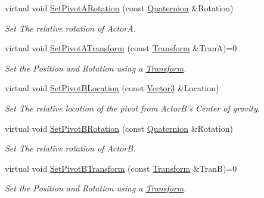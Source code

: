 \begin{DoxyCompactItemize}
virtual void \hyperlink{classphys_1_1DualTransformConstraint_ab602e9a72e490dcb34bb6ad2042a2341}{SetPivotARotation} (const \hyperlink{classphys_1_1Quaternion}{Quaternion} \&Rotation)
\begin{DoxyCompactList}\small\item\em Set The relative rotation of ActorA. \item\end{DoxyCompactList}\item 
virtual void \hyperlink{classphys_1_1DualTransformConstraint_af2ff2bca0d94f113ef47a8dfddeadb3a}{SetPivotATransform} (const \hyperlink{classphys_1_1Transform}{Transform} \&TranA)=0
\begin{DoxyCompactList}\small\item\em Set the Position and Rotation using a \hyperlink{classphys_1_1Transform}{Transform}. \item\end{DoxyCompactList}\item 
virtual void \hyperlink{classphys_1_1DualTransformConstraint_aa9e0ebd04572d18f344b701637270248}{SetPivotBLocation} (const \hyperlink{classphys_1_1Vector3}{Vector3} \&Location)
\begin{DoxyCompactList}\small\item\em Set The relative location of the pivot from ActorB's Center of gravity. \item\end{DoxyCompactList}\item 
virtual void \hyperlink{classphys_1_1DualTransformConstraint_a6eb22ee671ccc51c16f04c65e1a05a9e}{SetPivotBRotation} (const \hyperlink{classphys_1_1Quaternion}{Quaternion} \&Rotation)
\begin{DoxyCompactList}\small\item\em Set The relative rotation of ActorB. \item\end{DoxyCompactList}\item 
virtual void \hyperlink{classphys_1_1DualTransformConstraint_acda6a28b585c52fd7da1e79d85f4cf53}{SetPivotBTransform} (const \hyperlink{classphys_1_1Transform}{Transform} \&TranB)=0
\begin{DoxyCompactList}\small\item\em Set the Position and Rotation using a \hyperlink{classphys_1_1Transform}{Transform}. \item\end{DoxyCompactList}\end{DoxyCompactItemize}


